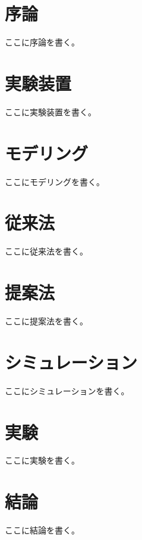 \documentclass[11pt,a4paper,oneside,onecolumn,fleqn,dvipdfmx]{jsarticle}
\begin{document}
\thispagestyle{empty}
\begin{center}
    \vspace*{20pt}
    {\fontsize{60pt}{0pt}\selectfont{卒業論文}}
    \vskip 80pt
    {\fontsize{40pt}{0pt}\selectfont{題目}}
    \vskip 80pt
    {\fontsize{30pt}{0pt}\selectfont{yyyy年mm月dd日 \ 提出}}
    \vskip 60pt
    {\fontsize{30pt}{0pt}\selectfont{指導教員}}
    \vskip 10pt
    {\fontsize{30pt}{0pt}\selectfont{堀 洋一 教授}}
    \vskip 10pt
    {\fontsize{30pt}{0pt}\selectfont{藤本 博志 准教授}}
    \vskip 60pt
    {\fontsize{30pt}{0pt}\selectfont{電気電子工学科}}
    \vskip 20pt
    {\fontsize{30pt}{0pt}\selectfont{00-000000\ \ 名前}}
\end{center}
\clearpage

\tableofcontents
\clearpage

\listoffigures
\listoftables
\clearpage

\section{序論}
ここに序論を書く。

\section{実験装置}
ここに実験装置を書く。

\section{モデリング}
ここにモデリングを書く。

\section{従来法}
ここに従来法を書く。

\section{提案法}
ここに提案法を書く。

\section{シミュレーション}
ここにシミュレーションを書く。

\section{実験}
ここに実験を書く。

\section{結論}
ここに結論を書く。



\end{document}
